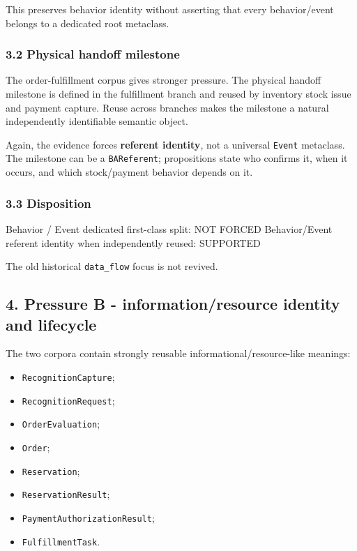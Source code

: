 \documentclass[
  10pt,
]{article}
\newenvironment{Shaded}{}{}
\newcommand{\NormalTok}[1]{#1}
\providecommand{\tightlist}{%
  \setlength{\itemsep}{0pt}\setlength{\parskip}{0pt}}
\begin{document}
This preserves behavior identity without asserting that every
behavior/event belongs to a dedicated root metaclass.

\subsubsection{3.2 Physical handoff
milestone}\label{physical-handoff-milestone}

The order-fulfillment corpus gives stronger pressure. The physical
handoff milestone is defined in the fulfillment branch and reused by
inventory stock issue and payment capture. Reuse across branches makes
the milestone a natural independently identifiable semantic object.

Again, the evidence forces \textbf{referent identity}, not a universal
\texttt{Event} metaclass. The milestone can be a \texttt{BAReferent};
propositions state who confirms it, when it occurs, and which
stock/payment behavior depends on it.

\subsubsection{3.3 Disposition}\label{disposition}

\begin{Shaded}
\begin{Highlighting}[]
\NormalTok{Behavior / Event dedicated first{-}class split: NOT FORCED}
\NormalTok{Behavior/Event referent identity when independently reused: SUPPORTED}
\end{Highlighting}
\end{Shaded}

The old historical \texttt{data\_flow} focus is not revived.

\subsection{4. Pressure B - information/resource identity and
lifecycle}\label{pressure-b---informationresource-identity-and-lifecycle}

The two corpora contain strongly reusable informational/resource-like
meanings:

\begin{itemize}
\tightlist
\item
  \texttt{RecognitionCapture};
\item
  \texttt{RecognitionRequest};
\item
  \texttt{OrderEvaluation};
\item
  \texttt{Order};
\item
  \texttt{Reservation};
\item
  \texttt{ReservationResult};
\item
  \texttt{PaymentAuthorizationResult};
\item
  \texttt{FulfillmentTask}.
\end{itemize}
\end{document}
